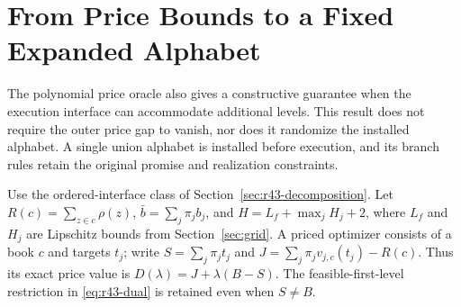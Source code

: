 \section{From Price Bounds to a Fixed Expanded Alphabet}\label{sec:r44-augmentation}
The polynomial price oracle also gives a constructive guarantee when the execution interface can accommodate additional levels. This result does not require the outer price gap to vanish, nor does it randomize the installed alphabet. A single union alphabet is installed before execution, and its branch rules retain the original promise and realization constraints.

Use the ordered-interface class of Section~\ref{sec:r43-decomposition}. Let $R(c)=\sum_{z\in c}\rho(z)$, $\bar b=\sum_j\pi_jb_j$, and $H=L_f+\max_jH_j+2$, where $L_f$ and $H_j$ are Lipschitz bounds from Section~\ref{sec:grid}. A priced optimizer consists of a book $c$ and targets $t_j$; write $S=\sum_j\pi_jt_j$ and $J=\sum_j\pi_jv_{j,c}(t_j)-R(c)$. Thus its exact price value is $D(\lambda)=J+\lambda(B-S)$. The feasible-first-level restriction in \eqref{eq:r43-dual} is retained even when $S\ne B$.

